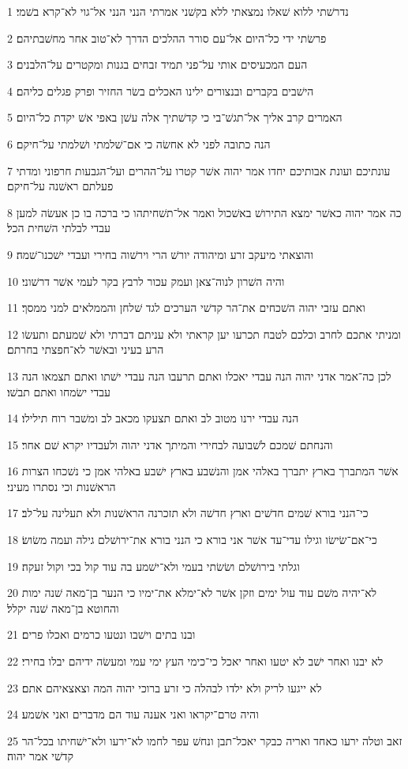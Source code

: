 \par 1 נדרשׁתי ללוא שׁאלו נמצאתי ללא בקשׁני אמרתי הנני הנני אל־גוי לא־קרא בשׁמי׃
\par 2 פרשׂתי ידי כל־היום אל־עם סורר ההלכים הדרך לא־טוב אחר מחשׁבתיהם׃
\par 3 העם המכעיסים אותי על־פני תמיד זבחים בגנות ומקטרים על־הלבנים׃
\par 4 הישׁבים בקברים ובנצורים ילינו האכלים בשׂר החזיר ופרק פגלים כליהם׃
\par 5 האמרים קרב אליך אל־תגשׁ־בי כי קדשׁתיך אלה עשׁן באפי אשׁ יקדת כל־היום׃
\par 6 הנה כתובה לפני לא אחשׂה כי אם־שׁלמתי ושׁלמתי על־חיקם׃
\par 7 עונתיכם ועונת אבותיכם יחדו אמר יהוה אשׁר קטרו על־ההרים ועל־הגבעות חרפוני ומדתי פעלתם ראשׁנה על־חיקם׃
\par 8 כה אמר יהוה כאשׁר ימצא התירושׁ באשׁכול ואמר אל־תשׁחיתהו כי ברכה בו כן אעשׂה למען עבדי לבלתי השׁחית הכל׃
\par 9 והוצאתי מיעקב זרע ומיהודה יורשׁ הרי וירשׁוה בחירי ועבדי ישׁכנו־שׁמה׃
\par 10 והיה השׁרון לנוה־צאן ועמק עכור לרבץ בקר לעמי אשׁר דרשׁוני׃
\par 11 ואתם עזבי יהוה השׁכחים את־הר קדשׁי הערכים לגד שׁלחן והממלאים למני ממסך׃
\par 12 ומניתי אתכם לחרב וכלכם לטבח תכרעו יען קראתי ולא עניתם דברתי ולא שׁמעתם ותעשׂו הרע בעיני ובאשׁר לא־חפצתי בחרתם׃
\par 13 לכן כה־אמר אדני יהוה הנה עבדי יאכלו ואתם תרעבו הנה עבדי ישׁתו ואתם תצמאו הנה עבדי ישׂמחו ואתם תבשׁו׃
\par 14 הנה עבדי ירנו מטוב לב ואתם תצעקו מכאב לב ומשׁבר רוח תילילו׃
\par 15 והנחתם שׁמכם לשׁבועה לבחירי והמיתך אדני יהוה ולעבדיו יקרא שׁם אחר׃
\par 16 אשׁר המתברך בארץ יתברך באלהי אמן והנשׁבע בארץ ישׁבע באלהי אמן כי נשׁכחו הצרות הראשׁנות וכי נסתרו מעיני׃
\par 17 כי־הנני בורא שׁמים חדשׁים וארץ חדשׁה ולא תזכרנה הראשׁנות ולא תעלינה על־לב׃
\par 18 כי־אם־שׂישׂו וגילו עדי־עד אשׁר אני בורא כי הנני בורא את־ירושׁלם גילה ועמה משׂושׂ׃
\par 19 וגלתי בירושׁלם ושׂשׂתי בעמי ולא־ישׁמע בה עוד קול בכי וקול זעקה׃
\par 20 לא־יהיה משׁם עוד עול ימים וזקן אשׁר לא־ימלא את־ימיו כי הנער בן־מאה שׁנה ימות והחוטא בן־מאה שׁנה יקלל׃
\par 21 ובנו בתים וישׁבו ונטעו כרמים ואכלו פרים׃
\par 22 לא יבנו ואחר ישׁב לא יטעו ואחר יאכל כי־כימי העץ ימי עמי ומעשׂה ידיהם יבלו בחירי׃
\par 23 לא ייגעו לריק ולא ילדו לבהלה כי זרע ברוכי יהוה המה וצאצאיהם אתם׃
\par 24 והיה טרם־יקראו ואני אענה עוד הם מדברים ואני אשׁמע׃
\par 25 זאב וטלה ירעו כאחד ואריה כבקר יאכל־תבן ונחשׁ עפר לחמו לא־ירעו ולא־ישׁחיתו בכל־הר קדשׁי אמר יהוה׃

